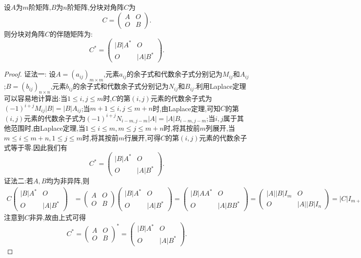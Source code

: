 \documentclass[lang=cn,newtx,10pt,scheme=chinese]{elegantbook}
\begin{document}
\begin{proposition}[分块矩阵的伴随矩阵]\label{proposition:分块矩阵的伴随矩阵}
设\(A\)为\(m\)阶矩阵,\(B\)为\(n\)阶矩阵,分块对角阵\(C\)为
\[
C = 
\begin{pmatrix}
A & O \\
O & B
\end{pmatrix}.
\]
则分块对角阵$C$的伴随矩阵为:
\[
C^* = 
\begin{pmatrix}
|B|A^* & O \\
O & |A|B^*
\end{pmatrix}.
\]
\end{proposition}
\begin{proof}
{\color{blue}证法一:}
设\(A = (a_{ij})_{m\times m}\),元素\(a_{ij}\)的余子式和代数余子式分别记为\(M_{ij}\)和\(A_{ij}\);\(B = (b_{ij})_{n\times n}\),元素\(b_{ij}\)的余子式和代数余子式分别记为\(N_{ij}\)和\(B_{ij}\).利用Laplace定理可以容易地计算出:当\(1 \leq i, j \leq m\)时,\(C\)的第\((i, j)\)元素的代数余子式为\((-1)^{i + j}M_{ij}|B| = |B|A_{ij}\);当\(m + 1 \leq i, j \leq m + n\)时,由Laplace定理,可知\(C\)的第\((i, j)\)元素的代数余子式为\((-1)^{i + j}N_{i - m, j - m}|A| = |A|B_{i - m, j - m}\);当\(i, j\)属于其他范围时,由Laplace定理,当$1\leq i\leq m,m\leq j\leq m+n$时,将其按前$m$列展开,当$m\leq i\leq m+n,1\leq j\leq m$时,将其按前$m$行展开,可得\(C\)的第\((i, j)\)元素的代数余子式等于零.因此我们有
\[
C^* = 
\begin{pmatrix}
|B|A^* & O \\
O & |A|B^*
\end{pmatrix}.
\]
{\color{blue}证法二:}若\(A,B\)均为非异阵,则
\begin{align*}
C\begin{pmatrix}
|B|A^* & O\\
O & |A|B^*
\end{pmatrix}&=\begin{pmatrix}
A & O\\
O & B
\end{pmatrix}\begin{pmatrix}
|B|A^* & O\\
O & |A|B^*
\end{pmatrix}
=\begin{pmatrix}
|B|AA^* & O\\
O & |A|BB^*
\end{pmatrix}=\begin{pmatrix}
|A||B|I_m & O\\
O & |A||B|I_n
\end{pmatrix}
=|C|I_{m + n}=CC^*,
\end{align*}
注意到\(C\)非异,故由上式可得
\[
C^*=\begin{pmatrix}
A & O\\
O & B
\end{pmatrix}^*=\begin{pmatrix}
|B|A^* & O\\
O & |A|B^*
\end{pmatrix}.
\]


\end{proof}
\end{document}
